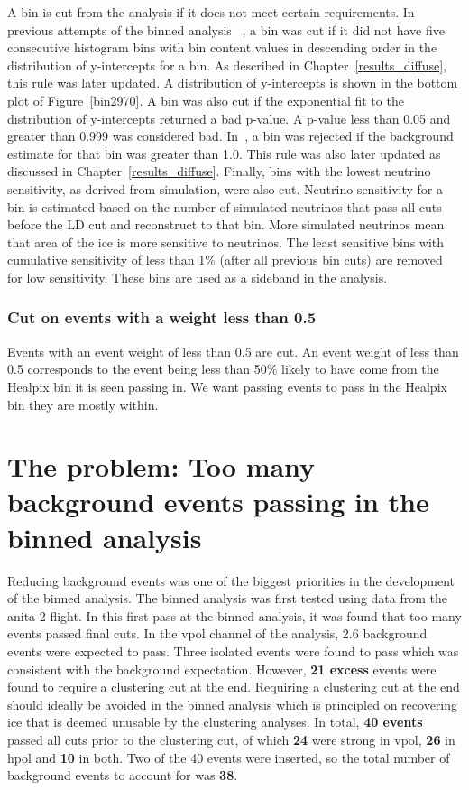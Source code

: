 A bin is cut from the analysis if it does not meet certain requirements. 
In previous attempts of the binned analysis ~\cite{samStaffordThesis,jacobGordonThesis}, a bin was 
cut if it did not have five consecutive histogram bins with bin content values in descending order in the distribution of y-intercepts for a bin. As described in Chapter~\ref{results_diffuse}, this rule was later updated.
A distribution of y-intercepts is shown in the bottom plot of Figure~\ref{bin2970}. 
A bin was also cut if the exponential fit to the distribution of y-intercepts returned a bad p-value. 
A p-value less than 0.05 and greater than 0.999 was considered bad. 
In~\cite{samStaffordThesis,jacobGordonThesis}, a bin was rejected if the background estimate for that bin was greater than 1.0. This rule was also later updated as discussed in Chapter~\ref{results_diffuse}. 
Finally, bins with the lowest neutrino sensitivity, as derived from simulation, were also cut.
Neutrino sensitivity for a bin is estimated based on the number of simulated neutrinos that pass all cuts before the LD cut and reconstruct to that bin.  
More simulated neutrinos mean that area of the ice is more sensitive to neutrinos.  The least sensitive bins with cumulative sensitivity of less than 1\% (after all previous bin cuts) are removed for low sensitivity. These bins are used as a sideband in the analysis.

\subsubsection{Cut on events with a weight less than 0.5}

Events with an event weight of less than 0.5 are cut.  An event weight of less than 0.5 corresponds to the event being less than 50\% likely to have come from the Healpix bin it is seen passing in.  We want passing events to pass in the Healpix bin they are mostly within.


\section{The problem: Too many background events passing in the binned analysis}
\label{background_problem}

Reducing background events was one of the biggest priorities in the development of the binned analysis. The binned analysis was first tested using data from the \gls{anita}-2 flight. In this first pass at the binned analysis, it was found that too many events passed final cuts. In the \gls{vpol} channel of the analysis, 2.6 background events were expected to pass. Three isolated events were found to pass which was consistent with the background expectation. However, {\bf 21 excess} events were found to require a clustering cut at the end. Requiring a clustering cut at the end should ideally be avoided in the binned analysis which is principled on recovering ice that is deemed unusable by the clustering analyses. In total, {\bf 40 events} passed all cuts prior to the clustering cut, of which {\bf 24} were strong in \gls{vpol}, {\bf 26} in \gls{hpol} and {\bf 10} in both. Two of the 40 events were inserted, so the total number of background events to account for was {\bf 38}.

